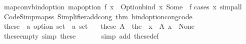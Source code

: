 \begin{isabellebody}
\ map{\isacharunderscore}{\kern0pt}conv{\isacharunderscore}{\kern0pt}bind{\isacharunderscore}{\kern0pt}option{\isacharcolon}{\kern0pt}\ {\isachardoublequoteopen}map{\isacharunderscore}{\kern0pt}option\ f\ x\ {\isacharequal}{\kern0pt}\ Option{\isachardot}{\kern0pt}bind\ x\ {\isacharparenleft}{\kern0pt}Some\ {\isasymcirc}\ f{\isacharparenright}{\kern0pt}{\isachardoublequoteclose}\isanewline
%
\isadelimproof
%
\endisadelimproof
%
\isatagproof
{}\isamarkupfalse%
{\isacharparenleft}{\kern0pt}cases\ x{\isacharparenright}{\kern0pt}\ simp{\isacharunderscore}{\kern0pt}all%
\endisatagproof
{\isafoldproof}%
%
\isadelimproof
\isanewline
%
\endisadelimproof
\isanewline
{}\isamarkupfalse%
\isanewline
%
\isadelimML
\isanewline
%
\endisadelimML
%
\isatagML
{}\isamarkupfalse%
\ {\isacartoucheopen}Code{\isacharunderscore}{\kern0pt}Simp{\isachardot}{\kern0pt}map{\isacharunderscore}{\kern0pt}ss\ {\isacharparenleft}{\kern0pt}Simplifier{\isachardot}{\kern0pt}add{\isacharunderscore}{\kern0pt}cong\ {\isacharat}{\kern0pt}{\isacharbraceleft}{\kern0pt}thm\ bind{\isacharunderscore}{\kern0pt}option{\isacharunderscore}{\kern0pt}cong{\isacharunderscore}{\kern0pt}code{\isacharbraceright}{\kern0pt}{\isacharparenright}{\kern0pt}{\isacartoucheclose}%
\endisatagML
{\isafoldML}%
%
\isadelimML
\isanewline
%
\endisadelimML
\isanewline
\isanewline
{}\isamarkupfalse%
\isanewline
{}\isanewline
\isanewline
{}\ \isamarkupfalse%
\ these\ {\isacharcolon}{\kern0pt}{\isacharcolon}{\kern0pt}\ {\isachardoublequoteopen}{\isacharprime}{\kern0pt}a\ option\ set\ {\isasymRightarrow}\ {\isacharprime}{\kern0pt}a\ set{\isachardoublequoteclose}\isanewline
\ \ \ {\isachardoublequoteopen}these\ A\ {\isacharequal}{\kern0pt}\ the\ {\isacharbackquote}{\kern0pt}\ {\isacharbraceleft}{\kern0pt}x\ {\isasymin}\ A{\isachardot}{\kern0pt}\ x\ {\isasymnoteq}\ None{\isacharbraceright}{\kern0pt}{\isachardoublequoteclose}\isanewline
\isanewline
{}\isamarkupfalse%
\ these{\isacharunderscore}{\kern0pt}empty\ {\isacharbrackleft}{\kern0pt}simp{\isacharbrackright}{\kern0pt}{\isacharcolon}{\kern0pt}\ {\isachardoublequoteopen}these\ {\isacharbraceleft}{\kern0pt}{\isacharbraceright}{\kern0pt}\ {\isacharequal}{\kern0pt}\ {\isacharbraceleft}{\kern0pt}{\isacharbraceright}{\kern0pt}{\isachardoublequoteclose}\isanewline
%
\isadelimproof
\ \ %
\endisadelimproof
%
\isatagproof
{}\isamarkupfalse%
\ {\isacharparenleft}{\kern0pt}simp\ add{\isacharcolon}{\kern0pt}\ these{\isacharunderscore}{\kern0pt}def{\isacharparenright}{\kern0pt}%

\end{isabellebody}
